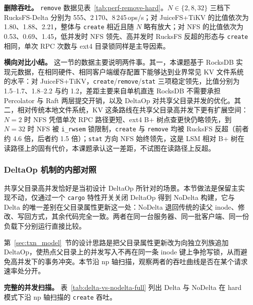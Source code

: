 \textbf{删除吞吐。} \texttt{remove} 数据见表~\ref{tab:perf-remove-hard}。$N \in \{2, 8, 32\}$ 三档下 RucksFS-Delta 分别为 555、2\,170、8\,245\,ops/s；对 JuiceFS+TiKV 的比值依次为 1.80、1.88、2.21，整体与 \texttt{create} 相近且随 $N$ 略有放大；对 NFS 的比值依次为 0.53、0.69、1.45，低并发时 NFS 领先、高并发时 RucksFS 反超的形态与 \texttt{create} 相同，单次 RPC 次数与 ext4 目录锁同样是主导因素。

\textbf{横向对比小结。} 这一节的数据主要说明两件事。其一，本课题基于 RocksDB 实现元数据，在相同硬件、相同客户端缓存配置下能够达到业界常见 KV 文件系统的水平：对 JuiceFS+TiKV，\texttt{create}/\texttt{remove}/\texttt{stat} 三项稳定领先，比值分别为 1.5--1.7、1.8--2.2 与约 1.2，差距主要来自单机直连 RocksDB 不需要承担 Percolator 与 Raft 两层提交开销，以及 DeltaOp 对共享父目录并发的优化。其二，相对传统本地文件系统，KV 这条路线在共享父目录高并发下更有扩展空间：$N=2$ 时 NFS 凭借单次 RPC 路径更短、ext4 B+ 树点查更快仍略领先，到 $N=32$ 时 NFS 被 \texttt{i\_rwsem} 锁限制，\texttt{create} 与 \texttt{remove} 均被 RucksFS 反超（前者约 4.6 倍，后者约 1.5 倍）；\texttt{stat} 方向 NFS 始终领先，这是 LSM 相对 B+ 树在读路径上的固有代价，本课题承认这一差距，不试图在读路径上反超。

\subsubsection{DeltaOp 机制的内部对照}
\label{sec:delta-vs-nodelta}

共享父目录高并发恰好是当初设计 DeltaOp 所针对的场景。本节做法是保留主实现不动，仅通过一个 \texttt{cargo} 特性开关关闭 DeltaOp 得到 NoDelta 构建，它与 Delta 的唯一差别在父目录属性更新这一处：NoDelta 退回传统的读父 inode、修改、写回方式，其余代码完全一致。两者在同一台服务器、同一批客户端、同一份负载下分别运行直接比较。

第~\ref{sec:txn_model}~节的设计思路是把父目录属性更新改为向独立列族追加 DeltaOp，使热点父目录上的并发写入不再在同一条 inode 键上争抢写锁，从而避免高并发下的事务冲突。本节沿 $\mathrm{np}$ 轴扫描，观察两者的吞吐曲线是否在某个请求速率处分开。

\textbf{完整的并发扫描。} 表~\ref{tab:delta-vs-nodelta-full} 列出 Delta 与 NoDelta 在 hard 模式下沿 $\mathrm{np}$ 轴扫描的 \texttt{create} 吞吐。

